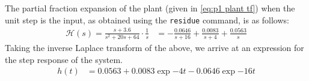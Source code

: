 \problem

The partial fraction expansion of the plant (given in \cref{eq:p1 plant tf}) when the unit step is the input, as obtained using the \texttt{residue} command, is as follows:
\begin{align*}
	\mathcal{H}(s) = \frac{s+3.6}{s^2+20s+64}\cdot\frac{1}{s} &= -\frac{0.0646}{s+16} + \frac{0.0083}{s+4} + \frac{0.0563}{s}
\end{align*}
Taking the inverse Laplace transform of the above, we arrive at an expression for the step response of the system.
\begin{align*}
	h(t) &= 0.0563 + 0.0083\exp{-4t} -0.0646\exp{-16t}
\end{align*}



